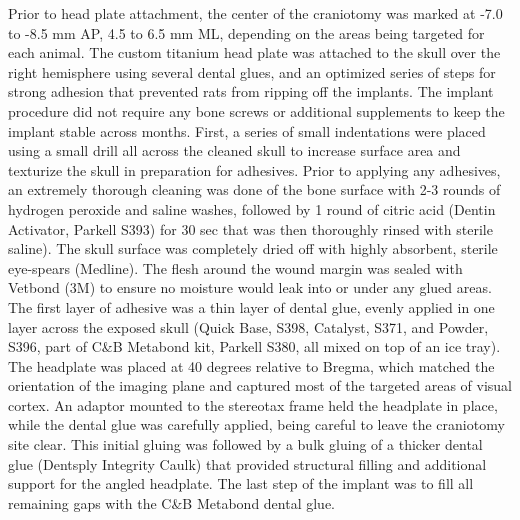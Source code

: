 Prior to head plate attachment, the center of the craniotomy was marked at -7.0 to -8.5 mm AP, 4.5 to 6.5 mm ML, depending on the areas being targeted for each animal. The custom titanium head plate was attached to the skull over the right hemisphere using several dental glues, and an optimized series of steps for strong adhesion that prevented rats from ripping off the implants. The implant procedure did not require any bone screws or additional supplements to keep the implant stable across months. First, a series of small indentations were placed using a small drill all across the cleaned skull to increase surface area and texturize the skull in preparation for adhesives. Prior to applying any adhesives, an extremely thorough cleaning was done of the bone surface with 2-3 rounds of hydrogen peroxide and saline washes, followed by 1 round of citric acid (Dentin Activator, Parkell S393) for 30 sec that was then thoroughly rinsed with sterile saline). The skull surface was completely dried off with highly absorbent, sterile eye-spears (Medline). The flesh around the wound margin was sealed with Vetbond (3M) to ensure no moisture would leak into or under any glued areas. The first layer of adhesive was a thin layer of dental glue, evenly applied in one layer across the exposed skull (Quick Base, S398, Catalyst, S371, and Powder, S396, part of C\&B Metabond kit, Parkell S380, all mixed on top of an ice tray). The headplate was placed at 40 degrees relative to Bregma, which matched the orientation of the imaging plane and captured most of the targeted areas of visual cortex. An adaptor mounted to the stereotax frame held the headplate in place, while the dental glue was carefully applied, being careful to leave the craniotomy site clear. This initial gluing was followed by a bulk gluing of a thicker dental glue (Dentsply Integrity Caulk) that provided structural filling and additional support for the angled headplate. The last step of the implant was to fill all remaining gaps with the C\&B Metabond dental glue. 

